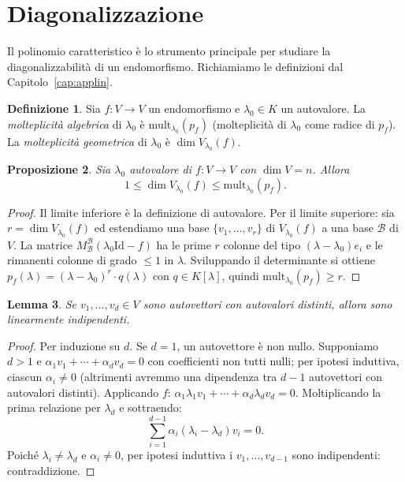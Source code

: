 \documentclass[11pt, a4paper]{book}
\theoremstyle{definition}
\newtheorem{definizione}{Definizione}[section]
\theoremstyle{plain}
\newtheorem{proposizione}[definizione]{Proposizione}
\newtheorem{lemma}[definizione]{Lemma}
\theoremstyle{remark}
\newcommand{\Id}{\mathrm{Id}}
\begin{document}
\section{Diagonalizzazione}
\label{sec:diagonalizzazione}

Il polinomio caratteristico è lo strumento principale per studiare la diagonalizzabilità di un endomorfismo. Richiamiamo le definizioni dal Capitolo~\ref{cap:applin}.

\begin{defbox}
\begin{definizione}
Sia $f \colon V \to V$ un endomorfismo e $\lambda_0 \in K$ un autovalore. La \emph{molteplicità algebrica} di $\lambda_0$ è $\mathrm{mult}_{\lambda_0}(p_f)$ (molteplicità di $\lambda_0$ come radice di $p_f$). La \emph{molteplicità geometrica} di $\lambda_0$ è $\dim V_{\lambda_0}(f)$.
\end{definizione}
\end{defbox}

\begin{proposizione}
\label{prop:mult-geom-alg}
Sia $\lambda_0$ autovalore di $f \colon V \to V$ con $\dim V = n$. Allora
\[
  1 \leq \dim V_{\lambda_0}(f) \leq \mathrm{mult}_{\lambda_0}(p_f).
\]
\end{proposizione}

\begin{proof}
Il limite inferiore è la definizione di autovalore. Per il limite superiore: sia $r = \dim V_{\lambda_0}(f)$ ed estendiamo una base $\{v_1,\ldots,v_r\}$ di $V_{\lambda_0}(f)$ a una base $\mathcal{B}$ di $V$. La matrice $M^{\mathcal{B}}_{\mathcal{B}}(\lambda_0\Id-f)$ ha le prime $r$ colonne del tipo $(\lambda-\lambda_0)e_i$ e le rimanenti colonne di grado $\leq 1$ in $\lambda$. Sviluppando il determinante si ottiene $p_f(\lambda) = (\lambda-\lambda_0)^r \cdot q(\lambda)$ con $q \in K[\lambda]$, quindi $\mathrm{mult}_{\lambda_0}(p_f) \geq r$.
\end{proof}

\begin{lemma}
\label{lemma:autovettori-indipendenti}
Se $v_1,\ldots,v_d \in V$ sono autovettori con autovalori distinti, allora sono linearmente indipendenti.
\end{lemma}

\begin{proof}
Per induzione su $d$. Se $d=1$, un autovettore è non nullo. Supponiamo $d>1$ e $\alpha_1 v_1 + \cdots + \alpha_d v_d = 0$ con coefficienti non tutti nulli; per ipotesi induttiva, ciascun $\alpha_i \neq 0$ (altrimenti avremmo una dipendenza tra $d-1$ autovettori con autovalori distinti). Applicando $f$: $\alpha_1\lambda_1 v_1 + \cdots + \alpha_d\lambda_d v_d = 0$. Moltiplicando la prima relazione per $\lambda_d$ e sottraendo:
\[
  \sum_{i=1}^{d-1}\alpha_i(\lambda_i - \lambda_d)v_i = 0.
\]
Poiché $\lambda_i \neq \lambda_d$ e $\alpha_i \neq 0$, per ipotesi induttiva i $v_1,\ldots,v_{d-1}$ sono indipendenti: contraddizione.
\end{proof}
\end{document}
